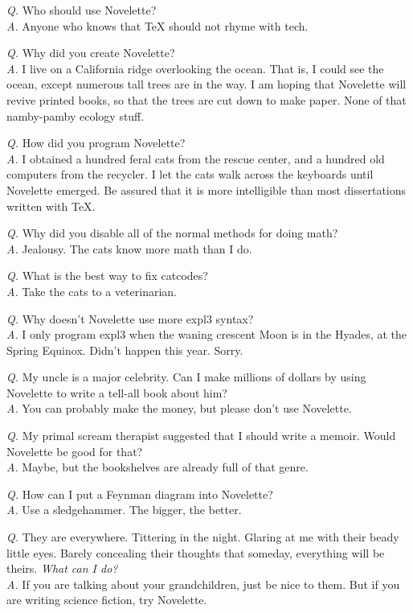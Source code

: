 \documentclass{novelette} %
\begin{document}
\begingroup\setlength\parindent{0pt}
\textit{Q.} Who should use Novelette?\\
\textit{A.} Anyone who knows that TeX should not rhyme with tech.\par
\textit{Q.} Why did you create Novelette?\\
\textit{A.} I live on a California ridge overlooking the ocean. That is,
I could see the ocean, except numerous tall trees are in the way. I am hoping
that Novelette will revive printed books, so that the trees are cut down
to make paper. None of that namby-pamby ecology stuff.\par
\textit{Q.} How did you program Novelette?\\
\textit{A.} I obtained a hundred feral cats from the rescue center, and a
hundred old computers from the recycler. I let the cats walk across the
keyboards until Novelette emerged. Be assured that it is more intelligible
than most dissertations written with TeX.\par
\textit{Q.} Why did you disable all of the normal methods for doing math?\\
\textit{A.} Jealousy. The cats know more math than I do.\par
\textit{Q.} What is the best way to fix catcodes?\\
\textit{A.} Take the cats to a veterinarian.\par
\textit{Q.} Why doesn't Novelette use more expl3 syntax?\\
\textit{A.} I only program expl3 when the waning crescent Moon is in the
Hyades, at the Spring Equinox. Didn't happen this year. Sorry.\par
\textit{Q.} My uncle is a major celebrity. Can I make millions of dollars
by using Novelette to write a tell-all book about him?\\
\textit{A.} You can probably make the money, but please don't use Novelette.\par
\textit{Q.} My primal scream therapist suggested that I should write a memoir.
Would Novelette be good for that?\\
\textit{A.} Maybe, but the bookshelves are already full of that genre.\par
\textit{Q.} How can I put a Feynman diagram into Novelette?\\
\textit{A.} Use a sledgehammer. The bigger, the better.\par
\textit{Q.} They are everywhere. Tittering in the night. Glaring at me with
their beady little eyes. Barely concealing their thoughts that someday,
everything will be theirs. \textit{What can I do?}\\
\textit{A.} If you are talking about your grandchildren, just be nice to them.
But if you are writing science fiction, try Novelette.\par
\endgroup

\makeatletter\nocle@rtoendtrue\makeatother
\end{document}
